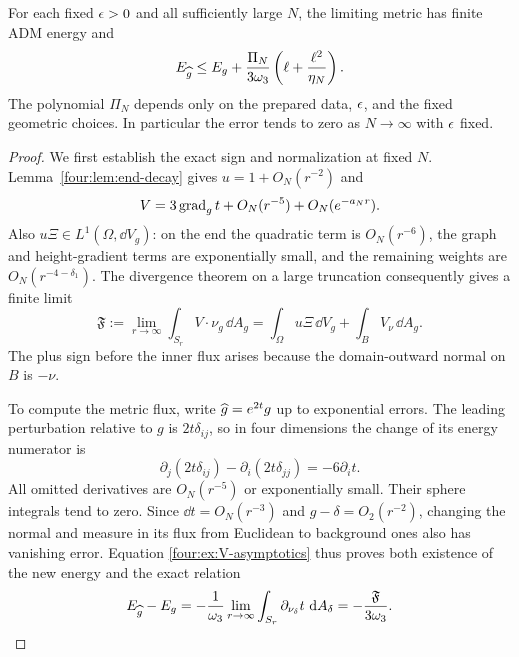 \begin{proposition}\label{four:prop:mass-comparison}
For each fixed $\epsilon>0$ and all sufficiently large $N$, the limiting
metric has finite ADM energy and
\begin{equation}\label{four:ex:energy-error}
 E_{\widehat g}\le E_g+\frac{\Pi_N}{3\omega_3}
                  \left(\ell+\frac{\ell^2}{\eta_N}\right).
\end{equation}
The polynomial $\Pi_N$ depends only on the prepared data, $\epsilon$,
and the fixed geometric choices.  In particular the error tends to
zero as $N\to\infty$ with $\epsilon$ fixed.
\end{proposition}

\begin{proof}
We first establish the exact sign and normalization at fixed $N$.
Lemma~\ref{four:lem:end-decay} gives $u=1+O_N(r^{-2})$ and
\begin{equation}\label{four:ex:V-asymptotics}
 V=3\operatorname{grad}_gt+O_N(r^{-5})+O_N(e^{-a_Nr}).
\end{equation}
Also $u\Xi\in L^1(\Omega,\dd V_g)$: on the end the quadratic term
is $O_N(r^{-6})$, the graph and height-gradient terms are exponentially
small, and the remaining weights are $O_N(r^{-4-\delta_1})$.
The divergence theorem on a large truncation consequently gives a
finite limit
\begin{equation}\label{four:ex:flux}
 \mathfrak F:=\lim_{r\to\infty}\int_{S_r}V\cdot\nu_g\,\dd A_g
   =\int_\Omega u\Xi\,\dd V_g+\int_B V_\nu\,\dd A_g.
\end{equation}
The plus sign before the inner flux arises because the domain-outward
normal on $B$ is $-\nu$.

To compute the metric flux, write $\widehat g=e^{2t}g$ up to exponential
errors.  The leading perturbation relative to $g$ is $2t\delta_{ij}$,
so in four dimensions the change of its energy numerator is
\[
 \partial_j(2t\delta_{ij})-\partial_i(2t\delta_{jj})
 =-6\partial_i t.
\]
All omitted derivatives are $O_N(r^{-5})$ or exponentially small.
Their sphere integrals tend to zero.  Since $\dd t=O_N(r^{-3})$ and
$g-\delta=O_2(r^{-2})$, changing the normal and measure in its flux
from Euclidean to background ones also has vanishing error.  Equation
\eqref{four:ex:V-asymptotics} thus proves both existence of the new energy
and the exact relation
\begin{equation}\label{four:ex:mass-flux}
 E_{\widehat g}-E_g
 =-\frac1{\omega_3}\lim_{r\to\infty}
       \int_{S_r}\partial_{\nu_\delta}t\,\,\mathrm d A_\delta
 =-\frac{\mathfrak F}{3\omega_3}.
\end{equation}


\end{proof}
